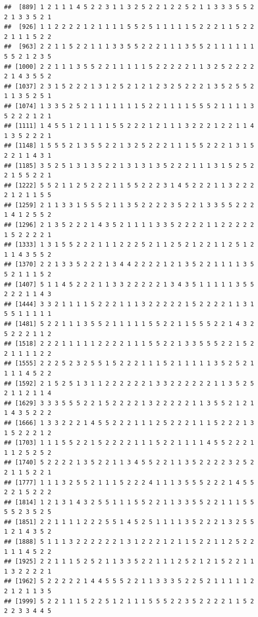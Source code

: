 \documentclass[]{book}
\begin{document}
\begin{verbatim}
##  [889] 1 2 1 1 1 4 5 2 2 3 1 1 3 2 5 2 2 1 2 2 5 2 1 1 3 3 3 5 5 2 2 1 3 3 5 2 1
##  [926] 1 1 2 2 2 2 1 2 1 1 1 1 5 5 2 5 1 1 1 1 1 5 2 2 2 1 1 5 2 2 2 1 1 1 5 2 2
##  [963] 2 2 1 1 5 2 2 1 1 1 3 3 5 5 2 2 2 1 1 1 3 5 5 2 1 1 1 1 1 1 5 5 2 1 2 3 5
## [1000] 2 2 1 1 1 3 5 5 2 2 1 1 1 1 1 5 2 2 2 2 2 1 1 3 2 5 2 2 2 2 2 1 4 3 5 5 2
## [1037] 2 3 1 5 2 2 2 1 3 1 2 5 2 1 2 1 2 3 2 5 2 2 2 1 3 5 2 5 5 2 1 1 3 5 2 5 1
## [1074] 1 3 3 5 2 5 2 1 1 1 1 1 1 1 5 2 2 1 1 1 1 5 5 5 2 1 1 1 1 3 5 2 2 2 1 2 1
## [1111] 1 4 5 5 1 2 1 1 1 1 5 5 2 2 2 1 2 1 1 1 3 2 2 2 1 2 2 1 1 4 1 3 5 2 2 2 1
## [1148] 1 5 5 5 2 1 3 5 5 2 2 1 3 2 5 2 2 2 1 1 1 5 5 2 2 2 1 3 1 5 2 2 1 1 4 3 1
## [1185] 3 5 2 5 1 3 1 3 5 2 2 1 3 1 3 1 3 5 2 2 2 1 1 1 3 1 5 2 5 2 2 1 5 5 2 2 1
## [1222] 5 5 2 1 1 2 5 2 2 2 1 1 5 5 2 2 2 3 1 4 5 2 2 2 1 1 3 2 2 2 2 1 2 1 1 5 5
## [1259] 2 1 1 3 3 1 5 5 5 2 1 1 3 5 2 2 2 2 3 5 2 2 1 3 3 5 5 2 2 2 1 4 1 2 5 5 2
## [1296] 2 1 3 5 2 2 2 1 4 3 5 2 1 1 1 1 3 3 5 2 2 2 2 1 1 2 2 2 2 2 1 5 2 2 2 2 1
## [1333] 1 3 1 5 5 2 2 2 1 1 1 2 2 2 5 2 1 1 2 5 2 1 2 2 1 1 2 5 1 2 1 1 4 3 5 5 2
## [1370] 2 2 1 3 3 5 2 2 2 1 3 4 4 2 2 2 2 1 2 1 3 5 2 2 1 1 1 1 3 5 5 2 1 1 1 5 2
## [1407] 5 1 1 4 5 2 2 2 1 1 3 3 2 2 2 2 2 1 3 4 3 5 1 1 1 1 1 3 5 5 2 2 2 1 1 4 3
## [1444] 3 3 2 1 1 1 1 5 2 2 2 1 1 1 3 2 2 2 2 2 1 5 2 2 2 2 1 1 3 1 5 5 1 1 1 1 1
## [1481] 5 2 2 1 1 1 3 5 5 2 1 1 1 1 1 5 5 2 2 1 1 5 5 5 2 2 1 4 3 2 5 2 2 2 1 1 2
## [1518] 2 2 2 1 1 1 1 1 2 2 2 2 1 1 1 5 5 2 2 1 3 3 5 5 5 2 2 1 5 2 2 1 1 1 1 2 2
## [1555] 2 2 2 5 2 3 2 5 5 1 5 2 2 2 1 1 1 5 2 1 1 1 1 1 3 5 2 5 2 1 1 1 1 4 5 2 2
## [1592] 2 1 5 2 5 1 3 1 1 2 2 2 2 2 2 1 3 3 2 2 2 2 2 2 1 1 3 5 2 5 2 1 1 2 1 1 4
## [1629] 3 3 3 5 5 5 2 2 1 5 2 2 2 2 1 3 2 2 2 2 2 1 1 3 5 5 2 1 2 1 1 4 3 5 2 2 2
## [1666] 1 3 3 2 2 2 1 4 5 5 2 2 2 1 1 1 2 5 2 2 2 1 1 1 5 2 2 2 1 3 1 5 2 2 2 1 2
## [1703] 1 1 1 5 5 2 2 1 5 2 2 2 2 1 1 1 5 2 2 1 1 1 1 4 5 5 2 2 2 1 1 1 2 5 2 5 2
## [1740] 5 2 2 2 2 1 3 5 2 2 1 1 3 4 5 5 2 2 1 1 3 5 2 2 2 2 3 2 5 2 2 1 1 5 2 2 1
## [1777] 1 1 1 3 2 5 5 2 1 1 1 5 2 2 2 4 1 1 1 3 5 5 5 2 2 2 1 4 5 5 2 2 1 5 2 2 2
## [1814] 1 2 1 3 1 4 3 2 5 5 1 1 1 5 5 2 2 1 1 3 3 5 5 2 2 1 1 1 5 5 5 5 2 3 5 2 5
## [1851] 2 2 1 1 1 1 2 2 2 5 5 1 4 5 2 5 1 1 1 1 3 5 2 2 2 1 3 2 5 5 1 2 1 4 3 5 2
## [1888] 5 1 1 1 3 2 2 2 2 2 2 1 3 1 2 2 2 1 2 1 1 5 2 2 1 1 2 5 2 2 1 1 1 4 5 2 2
## [1925] 2 2 1 1 1 5 2 5 2 1 1 3 3 5 2 2 1 1 1 2 5 2 1 2 1 5 2 2 1 1 1 3 2 2 2 2 1
## [1962] 5 2 2 2 2 2 1 4 4 5 5 5 2 2 1 1 3 3 3 5 2 2 5 2 1 1 1 1 1 2 2 1 2 1 1 3 5
## [1999] 5 2 2 1 1 1 5 2 2 5 1 2 1 1 1 5 5 5 2 2 3 5 2 2 2 2 1 1 5 2 2 2 3 3 4 4 5

\end{verbatim}
\end{document}
